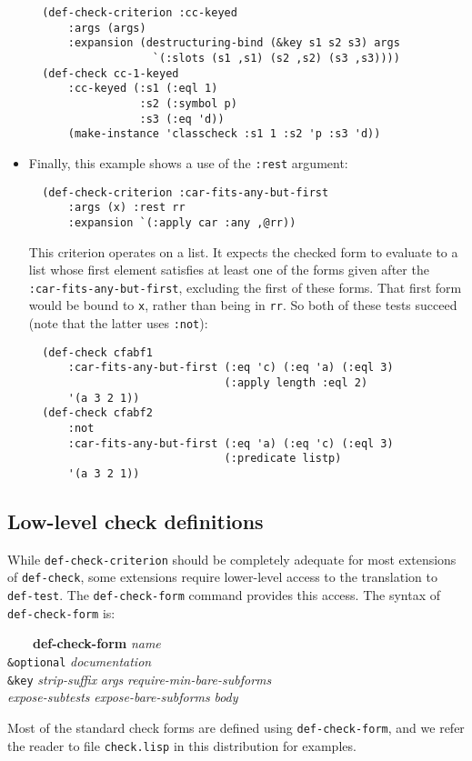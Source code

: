 \documentclass{article}
\begin{document}
\begin{itemize}
\begin{verbatim}
  (def-check-criterion :cc-keyed
      :args (args)
      :expansion (destructuring-bind (&key s1 s2 s3) args
                   `(:slots (s1 ,s1) (s2 ,s2) (s3 ,s3))))
  (def-check cc-1-keyed
      :cc-keyed (:s1 (:eql 1)
                 :s2 (:symbol p)
                 :s3 (:eq 'd))
      (make-instance 'classcheck :s1 1 :s2 'p :s3 'd))
\end{verbatim}
\item Finally, this example shows a use of the \texttt{:rest}
  argument:
\begin{verbatim}
  (def-check-criterion :car-fits-any-but-first
      :args (x) :rest rr
      :expansion `(:apply car :any ,@rr))
\end{verbatim}
  This criterion operates on a list.  It expects the checked form to
  evaluate to a list whose first element satisfies at least one of the
  forms given after the \texttt{:car-fits-any-but-first}, excluding
  the first of these forms.  That first form would be bound to
  \texttt{x}, rather than being in \texttt{rr}.  So both of these
  tests succeed (note that the latter uses \texttt{:not}):
\begin{verbatim}
  (def-check cfabf1
      :car-fits-any-but-first (:eq 'c) (:eq 'a) (:eql 3)
                              (:apply length :eql 2)
      '(a 3 2 1))
  (def-check cfabf2
      :not
      :car-fits-any-but-first (:eq 'a) (:eq 'c) (:eql 3)
                              (:predicate listp)
      '(a 3 2 1))
\end{verbatim}
\end{itemize}

\subsection{Low-level check definitions}
While \texttt{def-check-criterion} should be completely adequate for
most extensions of \texttt{def-check}, some extensions require
lower-level access to the translation to \texttt{def-test}.  The
\texttt{def-check-form} command provides this access.  The syntax of
\texttt{def-check-form} is:
\begin{tabbing}
  ~~~~\textbf{def-}\=\textbf{check-form} \textit{name}
  \\ \> \texttt{\&optional} \textit{documentation}
  \\ \> \texttt{\&key} \= \textit{strip-suffix} \textit{args}
  \textit{require-min-bare-subforms}
  \\ \> \>  \textit{expose-subtests} \textit{expose-bare-subforms} \textit{body}
\end{tabbing}
Most of the standard check forms are defined using
\texttt{def-check-form}, and we refer the reader to file
\texttt{check.lisp} in this distribution for examples.

\printindex
\end{document}
